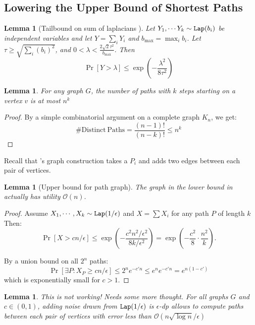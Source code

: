 \documentclass{article}
\newtheorem{lemma}[theorem]{Lemma}
\begin{document}

\subsection{Lowering the Upper Bound of Shortest Paths}

\begin{lemma}[Tailbound on sum of laplacians \cite{dwork_algorithmic_2014}]
Let $Y_1, \cdots Y_k \sim {\tt Lap}(b_i)$ be independent variables and let $Y = \sum_i Y_i$ and $b_\max = \max_i b_i$. Let $\tau \geq \sqrt{\sum_i(b_i)^2}$, and $0 <\lambda < \frac{2\sqrt{2}\tau^2}{b_\max}$. Then
\[
\Pr[Y > \lambda] \leq \exp\left(-\dfrac{\lambda^2}{8\tau^2}\right)
\]
\end{lemma}


\begin{lemma}
For any graph $G$, the number of paths with $k$ steps starting on a vertex $v$ is at most $n^k$
\end{lemma}
\begin{proof}
By a simple combinatorial argument on a complete graph $K_n$, we get:
\[
\#\mathrm{Distinct~Paths} = \dfrac{(n-1)!}{(n-k)!} \leq n^k
\]
\end{proof}

Recall that \cite{sealfon_shortest_2016}'s graph construction takes a $P_i$ and adds two edges between each pair of vertices.
\begin{lemma}[Upper bound for path graph]
The graph in the lower bound in \cite{sealfon_shortest_2016} actually has utility $\mathcal{O}(n)$.
\end{lemma}
\begin{proof}
Assume $X_1,\cdots,X_k \sim {\tt Lap}(1/\epsilon)$ and $X = \sum X_i$ for any path $P$ of length $k$
Then:
\[
\Pr[X > c n / \epsilon] \leq \exp\left(-\dfrac{c^2n^2/\epsilon^2}{8k/\epsilon^2}\right)
 = \exp\left(-\dfrac{c^2}{8}\cdot \dfrac{n^2}{k}\right).
\]

By a union bound on all $2^n$ paths:
\[
\Pr[\exists P: X_P \geq cn /\epsilon] \leq 2^n e^{-c'n} \leq e^n e^{-c'n}  =e^{n(1-c')}
\]
which is exponentially small for $c>1$.
\end{proof}

\begin{lemma}
{\color{red} This is not working! Needs some more thought.}
For all graphs $G$ and $c \in (0,1)$, adding noise drawn from ${\tt Lap}(1/\epsilon)$ is $\epsilon$-dp allows to compute paths between each pair of vertices with error less than $\mathcal{O}(n \sqrt{\log n}/\epsilon)$
\end{lemma}
\end{document}
